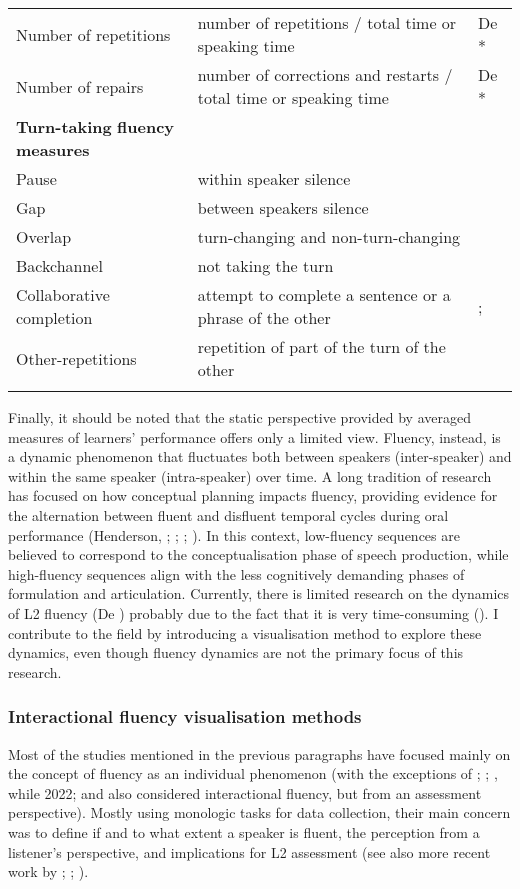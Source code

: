 \begin{tabularx}{\textwidth}{XXX}
Number of repetitions & number of repetitions / total time or speaking time & De \citet{Jong2016}*\\
Number of repairs & number of corrections and restarts / total time or speaking time & De \citet{Jong2016}*\\
\textbf{Turn-taking} \textbf{fluency} \textbf{measures} &  & \\
Pause & within speaker silence & \citet{HeldnerEdlund2010}\\
Gap & between speakers silence & \citet{HeldnerEdlund2010}\\
Overlap & turn-changing and non-turn-changing & \citet{HeldnerEdlund2010}\\
Backchannel & not taking the turn & \citet{Riggenbach1991} \\
Collaborative completion & attempt to complete a sentence or a phrase of the other & \citet{Riggenbach1991}; \citet{Peltonen2017}\\
Other-repetitions & repetition of part of the turn of the other & \citet{Peltonen2017}\\
\lspbottomrule
\end{tabularx}
Finally, it should be noted that the static perspective provided by averaged measures of learners’ performance offers only a limited view. Fluency, instead, is a dynamic phenomenon that fluctuates both between speakers (inter-speaker) and within the same speaker (intra-speaker) over time. A long tradition of research has focused on how conceptual planning impacts fluency, providing evidence for the alternation between fluent and disfluent temporal cycles during oral performance (Henderson, \citealt{Goldman-EislerSkarbek1966}; \citealt{Goldman-Eisler1967}; \citealt{Butterworth1975}; \citealt{Beattie1980}). In this context, low-fluency sequences are believed to correspond to the conceptualisation phase of speech production, while high-fluency sequences align with the less cognitively demanding phases of formulation and articulation. Currently, there is limited research on the dynamics of L2 fluency (De \citealt{Jong2023}) probably due to the fact that it is very time-consuming (\citealt{RobertsKirsner2000}). I contribute to the field by introducing a visualisation method to explore these dynamics, even though fluency dynamics are not the primary focus of this research.

\subsubsection{Interactional fluency visualisation methods}
\hypertarget{Toc191305928}{}
Most of the studies mentioned in the previous paragraphs have focused mainly on the concept of fluency as an individual phenomenon (with the exceptions of \citealt{Riggenbach1991}; \citealt{Tavakoli2016}; \citealt{Peltonen2017}, while 2022; and \citealt{Sato2014} also considered interactional fluency, but from an assessment perspective). Mostly using monologic tasks for data collection, their main concern was to define if and to what extent a speaker is fluent, the perception from a listener’s perspective, and implications for L2 assessment (see also more recent work by \citealt{Götz2013}; \citealt{Kahng2014}; \citealt{PeltonenLintunen2016}).

